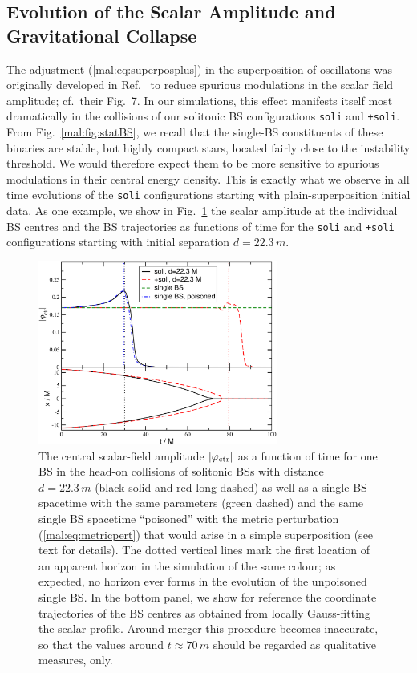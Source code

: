 \subsection{Evolution of the Scalar Amplitude and Gravitational Collapse}
%
The adjustment (\ref{mal:eq:superposplus}) in the superposition of oscillatons
was originally developed in Ref.~\cite{Helfer:2018vtq} to reduce
spurious modulations in the scalar field amplitude; cf.~their
Fig.~7. In our simulations, this effect manifests itself
most dramatically in the collisions of our solitonic BS
configurations {\tt soli} and {\tt +soli}.
From Fig.~\ref{mal:fig:statBS}, we recall that the single-BS constituents
of these binaries are stable, but highly compact stars, located
fairly close to the instability threshold. We would therefore expect
them to be more sensitive to spurious modulations in their central
energy density. This is exactly what we observe in all time evolutions
of the {\tt soli} configurations starting with plain-superposition
initial data. As one example, we show
in Fig.~\ref{mal:fig:soli_ampctr} the scalar amplitude
at the individual BS centres and the BS trajectories
as functions of time for the
{\tt soli} and {\tt +soli} configurations starting with initial
separation $d=22.3\,m$.
%
\begin{figure}
    \centering
    \includegraphics[width=0.7\textwidth]{malaise_source/ampctr_sBS.pdf}
    \caption{The central scalar-field amplitude $|\varphi_{\rm ctr}|$
    as a function of time for one BS in the head-on
    collisions of solitonic BSs with distance $d=22.3\,m$
    (black solid and red long-dashed) as well as a single
    BS spacetime with the same parameters (green dashed)
    and the same single BS spacetime ``poisoned'' with
    the metric perturbation (\ref{mal:eq:metricpert}) that would arise in a simple
    superposition (see text for details). The dotted
    vertical lines mark the first location of an
    apparent horizon in the simulation of the same colour;
    as expected, no horizon ever forms in the evolution
    of the unpoisoned single BS.
    In the bottom panel, we show for reference the coordinate
    trajectories of the BS centres as obtained from locally
    Gauss-fitting the scalar profile. Around merger this procedure
    becomes inaccurate, so that the values around $t\approx 70\,m$
    should be regarded as qualitative measures, only.
    }
    \label{mal:fig:soli_ampctr}
\end{figure}

